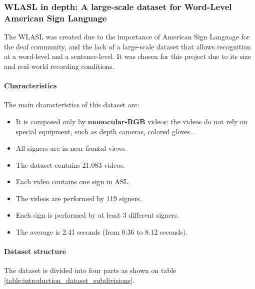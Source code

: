 \subsubsection{WLASL in depth: A large-scale dataset for Word-Level American Sign Language}
\label{section:WLASL}
The WLASL was created due to the importance of American Sign Language for the deaf community, and the lack of a large-scale dataset that allows recognition at a word-level and a sentence-level.
It was chosen for this project due to its size and real-world recording conditions.

\paragraph{Characteristics}
The main characteristics of this dataset are:
\begin{itemize}[noitemsep]
    \item It is composed only by \textbf{monocular-RGB} videos: the videos do not rely on special equipment, such as depth cameras, colored gloves...
    \item All signers are in near-frontal views.
    \item The dataset contains 21.083 videos.
    \item Each video contains one sign in ASL.
    \item The videos are performed by 119 signers.
    \item Each sign is performed by at least 3 different signers.
    \item The average is 2.41 seconds (from 0.36 to 8.12 seconds).
\end{itemize}

\paragraph{Dataset structure}
The dataset is divided into four parts as shown on table \ref{table:introduction_dataset_subdivisions}.
\begin{table}[h]
    \centering
\caption{WLASL dataset structure}
\label{table:introduction_dataset_subdivisions}
\end{table}

